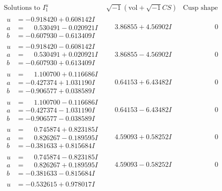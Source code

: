 \documentclass[1p]{elsarticle_modified}
\theoremstyle{definition}
\newcommand{\I}{\sqrt{-1}}
\begin{document}
$$\begin{array}{c|c|c}
\text{Solutions to }I^u_{1}& \I (\text{vol} + \sqrt{-1}CS) & \text{Cusp shape}\\
 \hline 
\begin{aligned}
u &= -0.918420 + 0.608142 I \\
a &= \phantom{-}0.530491 - 0.020921 I \\
b &= -0.607930 - 0.613409 I\end{aligned}
 & \phantom{-}3.86855 + 4.56902 I & \phantom{-0.000000 } 0 \\ \hline\begin{aligned}
u &= -0.918420 - 0.608142 I \\
a &= \phantom{-}0.530491 + 0.020921 I \\
b &= -0.607930 + 0.613409 I\end{aligned}
 & \phantom{-}3.86855 - 4.56902 I & \phantom{-0.000000 } 0 \\ \hline\begin{aligned}
u &= \phantom{-}1.100700 + 0.116686 I \\
a &= -0.427374 + 1.031190 I \\
b &= -0.906577 + 0.038589 I\end{aligned}
 & \phantom{-}0.64153 + 6.43482 I & \phantom{-0.000000 } 0 \\ \hline\begin{aligned}
u &= \phantom{-}1.100700 - 0.116686 I \\
a &= -0.427374 - 1.031190 I \\
b &= -0.906577 - 0.038589 I\end{aligned}
 & \phantom{-}0.64153 - 6.43482 I & \phantom{-0.000000 } 0 \\ \hline\begin{aligned}
u &= \phantom{-}0.745874 + 0.823185 I \\
a &= \phantom{-}0.826267 - 0.189595 I \\
b &= -0.381633 + 0.815684 I\end{aligned}
 & \phantom{-}4.59093 + 0.58252 I & \phantom{-0.000000 } 0 \\ \hline\begin{aligned}
u &= \phantom{-}0.745874 - 0.823185 I \\
a &= \phantom{-}0.826267 + 0.189595 I \\
b &= -0.381633 - 0.815684 I\end{aligned}
 & \phantom{-}4.59093 - 0.58252 I & \phantom{-0.000000 } 0 \\ \hline\begin{aligned}
u &= -0.532615 + 0.978017 I \\

\end{aligned}
\end{array}$$
\end{document}
